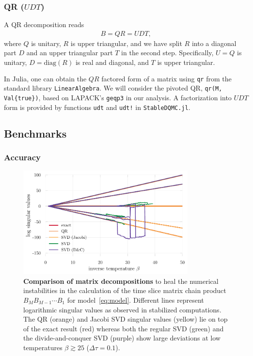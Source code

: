 \documentclass[submission, Phys]{SciPost}
\begin{document}
\subsubsection{QR ($UDT$)}
A QR decomposition reads
\begin{align}
	B = QR = UDT,
\end{align}
where $Q$ is unitary, $R$ is upper triangular, and we have split $R$ into a diagonal part $D$ and an upper triangular part $T$ in the second step. Specifically, $U = Q$ is unitary, $D = \textrm{diag}(R)$ is real and diagonal, and $T$ is upper triangular.

In Julia, one can obtain the $QR$ factored form of a matrix using \texttt{qr} from the standard library \texttt{LinearAlgebra}. We will consider the pivoted QR, \texttt{qr(M, Val\{true\})}, based on LAPACK's \texttt{geqp3} in our analysis. A factorization into $UDT$ form is provided by functions \texttt{udt} and \texttt{udt!} in \texttt{StableDQMC.jl}.


\subsection{Benchmarks}

\subsubsection{Accuracy}
\begin{figure}
	\centering
	\includegraphics[width=0.8\textwidth]{figures/decomp_comparison_simple.pdf}
	\caption{\textbf{Comparison of matrix decompositions} to heal the numerical instabilities in the calculation of the time slice matrix chain product $B_M B_{M-1} \cdots B_1$ for model~\eqref{eq:model}. Different lines represent logarithmic singular values as observed in stabilized computations. The QR (orange) and Jacobi SVD singular values (yellow) lie on top of the exact result (red) whereas both the regular SVD (green) and the divide-and-conquer SVD (purple) show large deviations at low temperatures $\beta \gtrsim 25$ ($\Delta \tau = 0.1$).}
	\label{fig:decomp_comparison_simple}
\end{figure}
\end{document}
